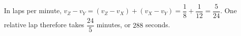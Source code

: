 In laps per minute, $ v_Z-v_Y=(v_Z-v_X)+(v_X-v_Y)=\dfrac{1}{8}+\dfrac{1}{12}=\dfrac{5}{24}$. One relative lap therefore takes $\dfrac{24}{5}$ minutes, or $\boxed{288}$ seconds.

